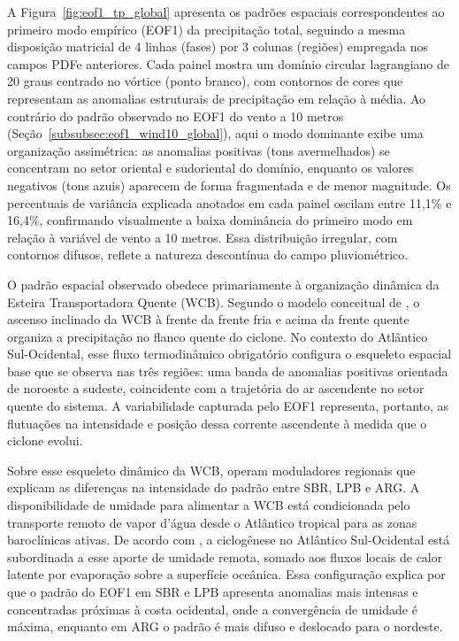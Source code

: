 A Figura~\ref{fig:eof1_tp_global} apresenta os padrões espaciais correspondentes ao primeiro modo empírico (EOF1) da precipitação total, seguindo a mesma disposição matricial de 4 linhas (fases) por 3 colunas (regiões) empregada nos campos PDFe anteriores.
Cada painel mostra um domínio circular lagrangiano de 20 graus centrado no vórtice (ponto branco), com contornos de cores que representam as anomalias estruturais de precipitação em relação à média.
Ao contrário do padrão observado no EOF1 do vento a 10 metros (Seção~\ref{subsubsec:eof1_wind10_global}), aqui o modo dominante exibe uma organização assimétrica: as anomalias positivas (tons avermelhados) se concentram no setor oriental e sudoriental do domínio, enquanto os valores negativos (tons azuis) aparecem de forma fragmentada e de menor magnitude.
Os percentuais de variância explicada anotados em cada painel oscilam entre 11,1\% e 16,4\%, confirmando visualmente a baixa dominância do primeiro modo em relação à variável de vento a 10 metros.
Essa distribuição irregular, com contornos difusos, reflete a natureza descontínua do campo pluviométrico.

O padrão espacial observado obedece primariamente à organização dinâmica da Esteira Transportadora Quente (WCB).
Segundo o modelo conceitual de \citet{browning1986conceptual}, o ascenso inclinado da WCB à frente da frente fria e acima da frente quente organiza a precipitação no flanco quente do ciclone.
No contexto do Atlântico Sul-Ocidental, esse fluxo termodinâmico obrigatório configura o esqueleto espacial base que se observa nas três regiões: uma banda de anomalias positivas orientada de noroeste a sudeste, coincidente com a trajetória do ar ascendente no setor quente do sistema.
A variabilidade capturada pelo EOF1 representa, portanto, as flutuações na intensidade e posição dessa corrente ascendente à medida que o ciclone evolui.

Sobre esse esqueleto dinâmico da WCB, operam moduladores regionais que explicam as diferenças na intensidade do padrão entre SBR, LPB e ARG.
A disponibilidade de umidade para alimentar a WCB está condicionada pelo transporte remoto de vapor d'água desde o Atlântico tropical para as zonas baroclínicas ativas.
De acordo com \citet{gozzo2017climatology}, a ciclogênese no Atlântico Sul-Ocidental está subordinada a esse aporte de umidade remota, somado aos fluxos locais de calor latente por evaporação sobre a superfície oceânica.
Essa configuração explica por que o padrão do EOF1 em SBR e LPB apresenta anomalias mais intensas e concentradas próximas à costa ocidental, onde a convergência de umidade é máxima, enquanto em ARG o padrão é mais difuso e deslocado para o nordeste.

